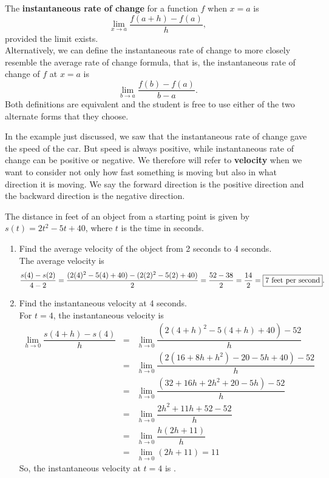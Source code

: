 \documentclass{book}
\begin{document}
\begin{Def} The \textbf{instantaneous rate of change} for a function $f$ when $x=a$ is \begin{equation} \lim_{x\to a} \dfrac{f(a+h) - f(a)}{h},\end{equation} provided the limit exists.\\

Alternatively, we can define the instantaneous rate of change to more closely resemble the average rate of change formula, that is, the instantaneous rate of change of $f$ at $x=a$ is 
\[\lim_{b\to a} \dfrac{f(b) - f(a)}{b-a}.\] Both definitions are equivalent and the student is free to use either of the two alternate forms that they choose.
\end{Def}\vs

In the example just discussed, we saw that the instantaneous rate of change gave the speed of the car. But speed is always positive, while instantaneous rate of change can be positive or negative. We therefore will refer to \textbf{velocity} when we want to consider not only how fast something is moving but also in what direction it is moving. We say the forward direction is the positive direction and the backward direction is the negative direction.

\begin{Exam} The distance in feet of an object from a starting point is given by $s(t) = 2t^2-5t + 40$, where $t$ is the time in seconds.
\begin{enumerate}
\item Find the average velocity of the object from 2 seconds to 4 seconds.\\

The average velocity is \[\dfrac{s(4)-s(2)}{4-2} = \dfrac{(2(4)^2-5(4)+40) - (2(2)^2-5(2)+40)}{2} = \dfrac{52-38}{2} = \dfrac{14}{2} = \fbox{7 feet per second}.\]

\item Find the instantaneous velocity at 4 seconds.\\

For $t=4$, the instantaneous velocity is
\begin{eqnarray*}
\lim_{h\to 0} \dfrac{s(4+h) - s(4)}{h} &= & \lim_{h\to 0}\dfrac{(2(4+h)^2 - 5(4+h) + 40) - 52}{h}\\ &=&   \lim_{h\to 0}\dfrac{(2(16+8h+h^2) - 20-5h + 40) - 52}{h}\\
&=&   \lim_{h\to 0}\dfrac{(32+16h+2h^2 + 20 - 5h) - 52}{h}\\ &=&   \lim_{h\to 0}\dfrac{2h^2+11h + 52  - 52}{h}\\
&=&   \lim_{h\to 0}\dfrac{h(2h+11)}{h}\\ &=&   \lim_{h\to 0}(2h+11)  = 11
\end{eqnarray*} So, the instantaneous velocity at $t=4$ is .
\end{enumerate}
\end{Exam}
\end{document}
